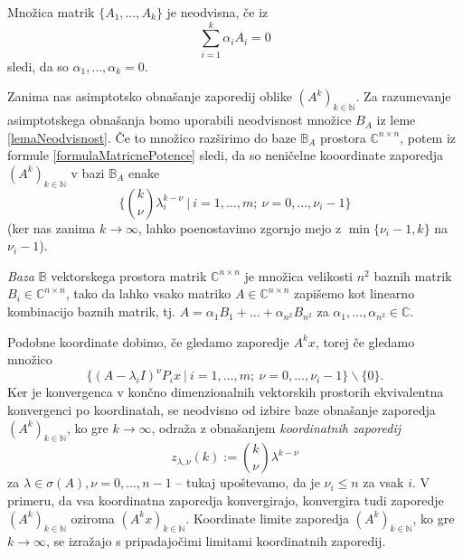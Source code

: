 \documentclass[mat1]{fmfdelo}
\newcommand{\N}{\mathbb N}
\newcommand{\C}{\mathbb C}
\begin{document}
\begin{opomba}
    Množica matrik $\{A_1, \ldots, A_k\}$ je neodvisna, če iz
    \begin{equation*}
        \sum_{i=1}^k \alpha_i A_i = 0
    \end{equation*}
    sledi, da so $\alpha_1, \ldots, \alpha_k = 0$.
\end{opomba}
Zanima nas asimptotsko obnašanje zaporedij oblike $(A^k)_{k\in\N}$. Za razumevanje asimptotskega obnašanja bomo uporabili neodvisnost množice $B_A$ iz leme \ref{lemaNeodvisnost}. Če to množico razširimo do baze $\mathbb{B}_A$ prostora $\C^{n \times n}$, potem iz formule \eqref{formulaMatricnePotence} sledi, da so neničelne kooordinate zaporedja $(A^k)_{k\in\N}$ v bazi $\mathbb{B}_A$ enake
\begin{equation*}
    \Big\{{k \choose \nu} \lambda_i^{k-\nu}\ |\ i = 1, \ldots, m;\ \nu = 0, \ldots, \nu_i-1\Big\}
\end{equation*}
(ker nas zanima $k \rightarrow \infty$, lahko poenostavimo zgornjo mejo z $\min\{\nu_i-1, k\}$ na $\nu_i - 1$).
\begin{opomba}
    \emph{Baza} $\mathbb{B}$ vektorskega prostora matrik $\C^{n\times n}$ je množica velikosti $n^2$ baznih matrik $B_i \in \C^{n\times n}$, tako da lahko vsako matriko $A \in \C^{n\times n}$ zapišemo kot linearno kombinacijo baznih matrik, tj. $A = \alpha_1 B_1 + \ldots + \alpha_{n^2} B_{n^2}$ za $\alpha_1, \ldots, \alpha_{n^2} \in \C$.
\end{opomba}
Podobne koordinate dobimo, če gledamo zaporedje $A^k x$, torej če gledamo množico
\begin{equation*}
    \{(A-\lambda_i I)^{\nu} P_i x\ |\ i = 1, \ldots, m;\ \nu = 0, \ldots, \nu_i - 1\} \backslash \{0\}.
\end{equation*}
Ker je konvergenca v končno dimenzionalnih vektorskih prostorih ekvivalentna konvergenci po koordinatah, se neodvisno od izbire baze obnašanje zaporedja $(A^k)_{k\in\N}$, ko gre $k \rightarrow \infty$, odraža z obnašanjem \emph{koordinatnih zaporedij}
\begin{equation*}
    z_{\lambda, \nu} (k) := {k \choose \nu} \lambda^{k - \nu}
\end{equation*}
za $\lambda \in \sigma(A), \nu = 0, \ldots, n-1$ -- tukaj upoštevamo, da je $\nu_i \leq n$ za vsak $i$. V primeru, da vsa koordinatna zaporedja konvergirajo, konvergira tudi zaporedje $(A^k)_{k\in\N}$ oziroma $(A^k x)_{k\in\N}$. Koordinate limite zaporedja $(A^k)_{k\in\N}$, ko gre $k \rightarrow \infty$, se izražajo s pripadajočimi limitami koordinatnih zaporedij.
\end{document}
